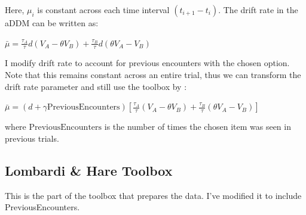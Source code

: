 \documentclass[
]{book}
\begin{document}
Here, \(\mu_i\) is constant across each time interval \((t_{i+1}-t_i)\). The drift rate in the aDDM can be written as:

\(\bar{\mu} = \frac{\tau_A}{\tau} d (V_A-\theta V_B) + \frac{\tau_B}{\tau} d (\theta V_A- V_B)\)

I modify drift rate to account for previous encounters with the chosen option. Note that this remains constant across an entire trial, thus we can transform the drift rate parameter and still use the toolbox by \citep{lombardi2021}:

\(\bar{\mu} = (d+\gamma \text{PreviousEncounters}) \left[ \frac{\tau_A}{\tau} (V_A-\theta V_B) + \frac{\tau_B}{\tau} (\theta V_A- V_B) \right]\)

where \(\text{PreviousEncounters}\) is the number of times the chosen item was seen in previous trials.

\hypertarget{lombardi-hare-toolbox}{%
\subsection{Lombardi \& Hare Toolbox}\label{lombardi-hare-toolbox}}

This is the part of the toolbox that prepares the data. I've modified it to include PreviousEncounters.
\end{document}

